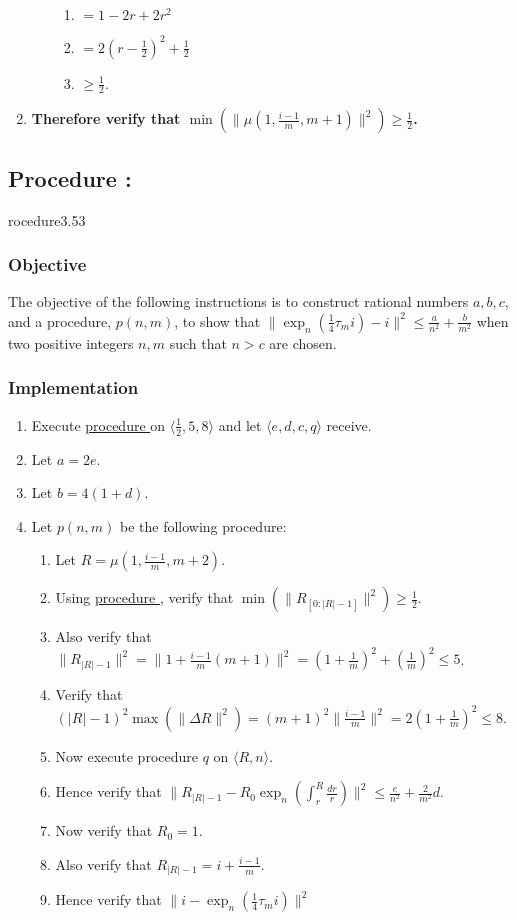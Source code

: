 \documentclass{article}
\newcounter{procedure}[part]
\newcommand{\procedure}[1]{\subsection*{Procedure \thepart:\theprocedure}\label{sec:procedure #1}\global\expandafter\edef\csname procedure#1\endcsname{\thepart:\theprocedure}\addtocounter{procedure}{1}}
\newcommand{\objective}{\subsubsection*{Objective}}
\newcommand{\implementation}{\subsubsection*{Implementation}}
\newcommand{\procedurehr}[1]{\hyperref[sec:procedure #1]{procedure \expandafter\csname procedure#1\endcsname}}
\begin{document}
\begin{multicols}{2}
\begin{enumerate}
\begin{enumerate}
\begin{enumerate}
							\item $=1-2r+2r^2$
							\item $=2(r-\frac{1}{2})^2+\frac{1}{2}$
							\item $\ge\frac{1}{2}$.
						\end{enumerate}
					\end{enumerate}
					\item \textbf{Therefore verify that $\min(\lVert\mu(1,\frac{i-1}{m},m+1)\rVert^2)\ge\frac{1}{2}$.}
				\end{enumerate}
		\procedure{3.53}
			\objective
				The objective of the following instructions is to construct rational numbers $a,b,c$, and a procedure, $p(n,m)$, to show that $\lVert\exp_n(\frac{1}{4}\tau_m i)-i\rVert^2\le\frac{a}{n^2}+\frac{b}{m^2}$ when two positive integers $n,m$ such that $n>c$ are chosen.
			\implementation
				\begin{enumerate}
					\item Execute \procedurehr{3.43} on $\langle\frac{1}{2},5,8\rangle$ and let $\langle e,d,c,q\rangle$ receive.
					\item Let $a=2e$.
					\item Let $b=4(1+d)$.
					\item Let $p(n,m)$ be the following procedure:
					\begin{enumerate}
						\item Let $R=\mu(1,\frac{i-1}{m},m+2)$.
						\item Using \procedurehr{3.51}, verify that $\min(\lVert R_{[0:\lvert R\rvert-1]}\rVert^2)\ge\frac{1}{2}$.
						\item Also verify that $\lVert R_{\lvert R\rvert-1}\rVert^2=\lVert 1+\frac{i-1}{m}(m+1)\rVert^2=(1+\frac{1}{m})^2+(\frac{1}{m})^2\le 5$.
						\item Verify that $(\lvert R\rvert-1)^2\max(\lVert\Delta R\rVert^2)=(m+1)^2\lVert\frac{i-1}{m}\rVert^2=2(1+\frac{1}{m})^2\le 8$.
						\item Now execute procedure $q$ on $\langle R,n\rangle$.
						\item Hence verify that $\lVert R_{\lvert R\rvert-1}-R_0\exp_n(\int_r^R\frac{dr}{r})\rVert^2\le\frac{e}{n^2}+\frac{2}{m^2}d$.
						\item Now verify that $R_0=1$.
						\item Also verify that $R_{\lvert R\rvert-1}=i+\frac{i-1}{m}$.
						\item Hence verify that $\lVert i-\exp_n(\frac{1}{4}\tau_m i)\rVert^2$
						\begin{enumerate}

\end{enumerate}
\end{enumerate}
\end{enumerate}
\end{multicols}
\end{document}
